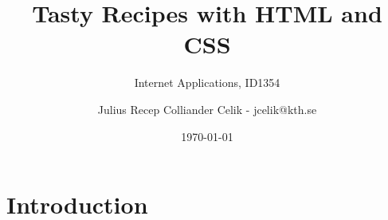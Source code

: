 \documentclass[a4paper]{scrartcl}
\title{Tasty Recipes with HTML and CSS}
\subtitle{Internet Applications, ID1354}
\author{Julius Recep Colliander Celik - jcelik@kth.se}
\date{\today}
\begin{document}
\maketitle

%
%
%
%
%
%
%
%
%

\section{Introduction}
\end{document}
